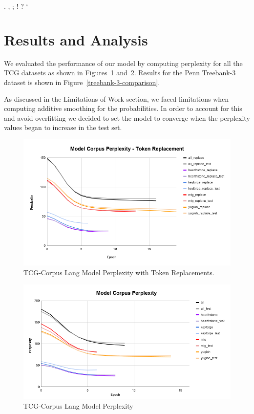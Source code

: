 \documentclass[11pt,a4paper]{article}
\begin{document}
\begin{center}
. \quad , \quad ; \quad ! \quad ? \quad `
\end{center}

\section{Results and Analysis}

We evaluated the performance of our model by computing perplexity for all the TCG datasets as shown in Figures~\ref{models-perplexity-replace} and~\ref{models-perplexity-no-replace}. Results for the Penn Treebank-3 dataset is shown in Figure~\ref{treebank-3-comparison}. 

As discussed in the Limitations of Work section, we faced limitations when computing additive smoothing for the probabilities. In order to account for this and avoid overfitting we decided to set the model to converge when the perplexity values began to increase in the test set.  

\begin{figure}[h]
	\includegraphics[width=\linewidth]{models_perplexity_replace.png}
	\caption{\label{models-perplexity-replace} TCG-Corpus Lang Model Perplexity with Token Replacements. }
\end{figure}

\begin{figure}[h]
	\includegraphics[width=\linewidth]{models_perplexity_no_replace.png}
	\caption{\label{models-perplexity-no-replace} TCG-Corpus Lang Model Perplexity }
\end{figure}
\end{document}
